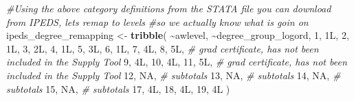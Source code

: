 \documentclass[
]{article}
\newenvironment{Shaded}{\begin{snugshade}}{\end{snugshade}}
\newcommand{\CommentTok}[1]{\textcolor[rgb]{0.56,0.35,0.01}{\textit{#1}}}
\newcommand{\ConstantTok}[1]{\textcolor[rgb]{0.56,0.35,0.01}{#1}}
\newcommand{\DataTypeTok}[1]{\textcolor[rgb]{0.13,0.29,0.53}{#1}}
\newcommand{\DecValTok}[1]{\textcolor[rgb]{0.00,0.00,0.81}{#1}}
\newcommand{\FunctionTok}[1]{\textcolor[rgb]{0.13,0.29,0.53}{\textbf{#1}}}
\newcommand{\NormalTok}[1]{#1}
\newcommand{\OtherTok}[1]{\textcolor[rgb]{0.56,0.35,0.01}{#1}}
\newcommand{\SpecialCharTok}[1]{\textcolor[rgb]{0.81,0.36,0.00}{\textbf{#1}}}
\newcommand{\StringTok}[1]{\textcolor[rgb]{0.31,0.60,0.02}{#1}}
\begin{document}
\begin{Shaded}
\begin{Highlighting}[]
\CommentTok{\#Using the above category definitions from the STATA file you can download from IPEDS, let\textquotesingle{}s remap to levels}
\CommentTok{\#so we actually know what is goin on}
\NormalTok{ipeds\_degree\_remapping }\OtherTok{\textless{}{-}} \FunctionTok{tribble}\NormalTok{(}
  \SpecialCharTok{\textasciitilde{}}\NormalTok{awlevel, }\SpecialCharTok{\textasciitilde{}}\NormalTok{degree\_group\_logord,}
  \StringTok{\textquotesingle{}1\textquotesingle{}}\NormalTok{,        }\DecValTok{1}\DataTypeTok{L}\NormalTok{,}
  \StringTok{\textquotesingle{}2\textquotesingle{}}\NormalTok{,        }\DecValTok{1}\DataTypeTok{L}\NormalTok{,}
  \StringTok{\textquotesingle{}3\textquotesingle{}}\NormalTok{,        }\DecValTok{2}\DataTypeTok{L}\NormalTok{,}
  \StringTok{\textquotesingle{}4\textquotesingle{}}\NormalTok{,        }\DecValTok{1}\DataTypeTok{L}\NormalTok{,}
  \StringTok{\textquotesingle{}5\textquotesingle{}}\NormalTok{,        }\DecValTok{3}\DataTypeTok{L}\NormalTok{,}
  \StringTok{\textquotesingle{}6\textquotesingle{}}\NormalTok{,        }\DecValTok{1}\DataTypeTok{L}\NormalTok{,}
  \StringTok{\textquotesingle{}7\textquotesingle{}}\NormalTok{,        }\DecValTok{4}\DataTypeTok{L}\NormalTok{,}
  \StringTok{\textquotesingle{}8\textquotesingle{}}\NormalTok{,        }\DecValTok{5}\DataTypeTok{L}\NormalTok{,    }\CommentTok{\# grad certificate, has not been included in the Supply Tool}
  \StringTok{\textquotesingle{}9\textquotesingle{}}\NormalTok{,        }\DecValTok{4}\DataTypeTok{L}\NormalTok{,}
  \StringTok{\textquotesingle{}10\textquotesingle{}}\NormalTok{,         }\DecValTok{4}\DataTypeTok{L}\NormalTok{,}
  \StringTok{\textquotesingle{}11\textquotesingle{}}\NormalTok{,         }\DecValTok{5}\DataTypeTok{L}\NormalTok{,    }\CommentTok{\# grad certificate, has not been included in the Supply Tool}
  \StringTok{\textquotesingle{}12\textquotesingle{}}\NormalTok{,       }\ConstantTok{NA}\NormalTok{,    }\CommentTok{\# subtotals}
  \StringTok{\textquotesingle{}13\textquotesingle{}}\NormalTok{,       }\ConstantTok{NA}\NormalTok{,    }\CommentTok{\# subtotals}
  \StringTok{\textquotesingle{}14\textquotesingle{}}\NormalTok{,       }\ConstantTok{NA}\NormalTok{,    }\CommentTok{\# subtotals}
  \StringTok{\textquotesingle{}15\textquotesingle{}}\NormalTok{,       }\ConstantTok{NA}\NormalTok{,    }\CommentTok{\# subtotals}
  \StringTok{\textquotesingle{}17\textquotesingle{}}\NormalTok{,         }\DecValTok{4}\DataTypeTok{L}\NormalTok{,}
  \StringTok{\textquotesingle{}18\textquotesingle{}}\NormalTok{,         }\DecValTok{4}\DataTypeTok{L}\NormalTok{,}
  \StringTok{\textquotesingle{}19\textquotesingle{}}\NormalTok{,         }\DecValTok{4}\DataTypeTok{L}
\NormalTok{)}
  

\end{Highlighting}
\end{Shaded}
\end{document}
